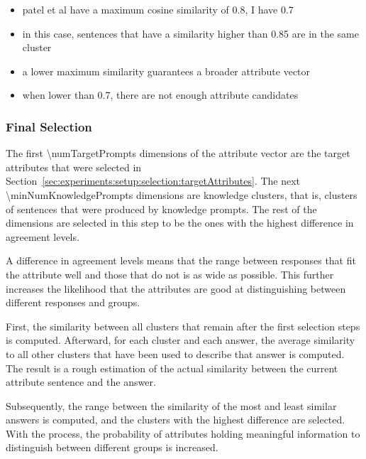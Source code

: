 \begin{itemize}
  \item patel et al have a maximum cosine similarity of 0.8, I have 0.7
  \item in this case, sentences that have a similarity higher than 0.85 are in the same cluster
  \item a lower maximum similarity guarantees a broader attribute vector
  \item when lower than 0.7, there are not enough attribute candidates
\end{itemize}

\subsubsection{Final Selection} %
\label{sec:experiments:setup:selection:finalSelection}
The first \num{\numTargetPrompts} dimensions of the attribute vector are the target attributes that were selected in Section~\ref{sec:experiments:setup:selection:targetAttributes}. The next \num{\minNumKnowledgePrompts} dimensions are knowledge clusters, that is, clusters of sentences that were produced by knowledge prompts. The rest of the dimensions are selected in this step to be the ones with the highest difference in agreement levels.

A difference in agreement levels means that the range between responses that fit the attribute well and those that do not is as wide as possible. This further increases the likelihood that the attributes are good at distinguishing between different responses and groups.



First, the similarity between all clusters that remain after the first selection steps is computed. Afterward, for each cluster and each answer, the average similarity to all other clusters that have been used to describe that answer is computed. The result is a rough estimation of the actual similarity between the current attribute sentence and the answer.

Subsequently, the range between the similarity of the most and least similar answers is computed, and the clusters with the highest difference are selected. With the process, the probability of attributes holding meaningful information to distinguish between different groups is increased.

